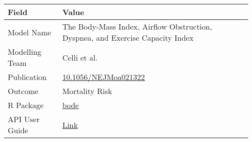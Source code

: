 \documentclass[
]{book}
\begin{document}
\begin{longtable}[]{@{}ll@{}}
\toprule
\begin{minipage}[b]{0.45\columnwidth}\raggedright
Field\strut
\end{minipage} & \begin{minipage}[b]{0.49\columnwidth}\raggedright
Value\strut
\end{minipage}\tabularnewline
\midrule
\endhead
\begin{minipage}[t]{0.45\columnwidth}\raggedright
Model Name\strut
\end{minipage} & \begin{minipage}[t]{0.49\columnwidth}\raggedright
The Body-Mass Index, Airflow Obstruction, Dyspnea, and Exercise Capacity Index\strut
\end{minipage}\tabularnewline
\begin{minipage}[t]{0.45\columnwidth}\raggedright
Modelling Team\strut
\end{minipage} & \begin{minipage}[t]{0.49\columnwidth}\raggedright
Celli et al.\strut
\end{minipage}\tabularnewline
\begin{minipage}[t]{0.45\columnwidth}\raggedright
Publication\strut
\end{minipage} & \begin{minipage}[t]{0.49\columnwidth}\raggedright
\href{https://doi.org/10.1056/NEJMoa021322}{10.1056/NEJMoa021322}\strut
\end{minipage}\tabularnewline
\begin{minipage}[t]{0.45\columnwidth}\raggedright
Outcome\strut
\end{minipage} & \begin{minipage}[t]{0.49\columnwidth}\raggedright
Mortality Risk\strut
\end{minipage}\tabularnewline
\begin{minipage}[t]{0.45\columnwidth}\raggedright
R Package\strut
\end{minipage} & \begin{minipage}[t]{0.49\columnwidth}\raggedright
\href{https://github.com/resplab/bode}{bode}\strut
\end{minipage}\tabularnewline
\begin{minipage}[t]{0.45\columnwidth}\raggedright
API User Guide\strut
\end{minipage} & \begin{minipage}[t]{0.49\columnwidth}\raggedright
\href{https://resplab.github.io/prismguide/api-users-guide.html\#bode}{Link}\strut
\end{minipage}\tabularnewline
\bottomrule
\end{longtable}
\end{document}
